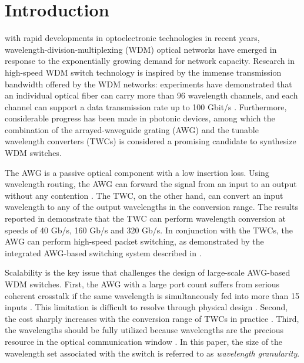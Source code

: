 \documentclass[journal]{IEEEtran}
\begin{document}
\IEEEpeerreviewmaketitle

\section{Introduction}\label{intro}
 with rapid developments in optoelectronic
technologies in recent years, wavelength-division-multiplexing (WDM)
optical networks have emerged in response to the exponentially
growing demand for network capacity. Research in high-speed WDM
switch technology is inspired by the immense transmission bandwidth
offered by the WDM networks: experiments have demonstrated that an
individual optical fiber can carry more than 96 wavelength channels,
and each channel can support a data transmission rate up to 100
Gbit/s \cite{Salsi:OFC2011}. Furthermore, considerable progress has
been made in photonic devices, among which the combination of the
arrayed-waveguide grating (AWG) and the tunable wavelength
converters (TWCs) is considered a promising candidate to synthesize
WDM switches.

The AWG is a passive optical component with a low insertion loss.
Using wavelength routing, the AWG can forward the signal from an
input to an output without any contention \cite{Ye:JLT2012}. The
TWC, on the other hand, can convert an input wavelength to any of
the output wavelengths in the conversion range. The results reported
in \cite{Blumenthal:JSTQE,Liu:JLT2006,Liu:JLT2007} demonstrate that
the TWC can perform wavelength conversion at speeds of 40 Gb/s, 160
Gb/s and 320 Gb/s. In conjunction with the TWCs, the AWG can perform
high-speed packet switching, as demonstrated by the integrated
 AWG-based switching system described in
\cite{Blumenthal:JSTQE}.

Scalability is the key issue that challenges the design of
large-scale AWG-based WDM switches. First, the AWG with a large port
count suffers from serious coherent crosstalk if the same wavelength
is simultaneously fed into more than 15 inputs
\cite{Gaudino:ICC2008,Bianco:TON}. This limitation is difficult to
resolve through physical design \cite{Mikhailov:OFC2003}. Second,
the cost sharply increases with the conversion range of TWCs in
practice \cite{Pattavina:INFOCOM2006}. Third, the wavelengths should
be fully utilized because wavelengths are the precious resource in
the optical communication window \cite{Weichenberg:JOCN2009}. In
this paper, the size of the wavelength set associated with the
switch is referred to as \emph{wavelength granularity}.
\end{document}
